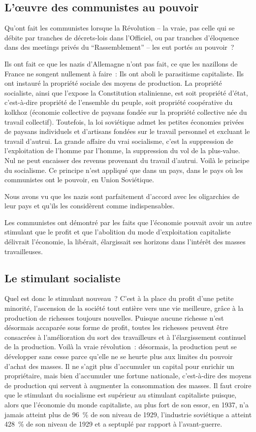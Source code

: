 \documentclass[french,twoside]{book} %
\begin{document}
\subsection[L’œuvre des communistes au pouvoir]{L’œuvre des communistes au pouvoir}
\noindent Qu’ont fait les communistes lorsque la Révolution – la vraie, pas celle qui se débite par tranches de décrets-lois dans l’Officiel, ou par tranches d’éloquence dans des meetings privés du “Rassemblement” – les eut portés au pouvoir ?\par
Ils ont fait ce que les nazis d’Allemagne n’ont pas fait, ce que les nazillons de France ne songent nullement à faire : Ils ont aboli le parasitisme capitaliste. Ils ont instauré la propriété sociale des moyens de production. La propriété socialiste, ainsi que l’expose la Constitution stalinienne, est soit propriété d’état, c’est-à-dire propriété de l’ensemble du peuple, soit propriété coopérative du kolkhoz (économie collective de paysans fondée sur la propriété collective née du travail collectif). Toutefois, la loi soviétique admet les petites économies privées de paysans individuels et d’artisans fondées sur le travail personnel et excluant le travail d’autrui. La grande affaire du vrai socialisme, c’est la suppression de l’exploitation de l’homme par l’homme, la suppression du vol de la plus-value. Nul ne peut encaisser des revenus provenant du travail d’autrui. Voilà le principe du socialisme. Ce principe n’est appliqué que dans un pays, dans le pays où les communistes ont le pouvoir, en Union Soviétique.\par
Nous avons vu que les nazis sont parfaitement d’accord avec les oligarchies de leur pays et qu’ils les considèrent comme indispensables.\par
Les communistes ont démontré par les faits que l’économie pouvait avoir un autre stimulant que le profit et que l’abolition du mode d’exploitation capitaliste délivrait l’économie, la libérait, élargissait ses horizons dans l’intérêt des masses travailleuses.
\subsection[Le stimulant socialiste]{Le stimulant socialiste}
\noindent Quel est donc le stimulant nouveau ? C’est à la place du profit d’une petite minorité, l’ascension de la société tout entière vers une vie meilleure, grâce à la production de richesses toujours nouvelles. Puisque aucune richesse n’est désormais accaparée sous forme de profit, toutes les richesses peuvent être consacrées à l’amélioration du sort des travailleurs et à l’élargissement continuel de la production. Voilà la vraie révolution : désormais, la production peut se développer sans cesse parce qu’elle ne se heurte plus aux limites du pouvoir d’achat des masses. Il ne s’agit plus d’accumuler un capital pour enrichir un propriétaire, mais bien d’accumuler une fortune nationale, c’est-à-dire des moyens de production qui servent à augmenter la consommation des masses. Il faut croire que le stimulant du socialisme est supérieur au stimulant capitaliste puisque, alors que l’économie du monde capitaliste, au plus fort de son essor, en 1937, n’a jamais atteint plus de 96 \% de son niveau de 1929, l’industrie soviétique a atteint 428 \% de son niveau de 1929 et a septuplé par rapport à l’avant-guerre.
\end{document}
